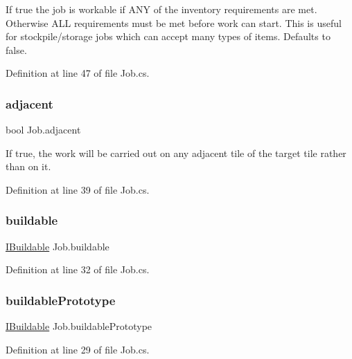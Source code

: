If true the job is workable if A\+NY of the inventory requirements are met. Otherwise A\+LL requirements must be met before work can start. This is useful for stockpile/storage jobs which can accept many types of items. Defaults to false. 



Definition at line 47 of file Job.\+cs.

\mbox{\label{class_job_a68dea057c25e34f4d55cb70e913991a8}} 
\subsubsection{\texorpdfstring{adjacent}{adjacent}}
{\footnotesize\ttfamily bool Job.\+adjacent}



If true, the work will be carried out on any adjacent tile of the target tile rather than on it. 



Definition at line 39 of file Job.\+cs.

\mbox{\label{class_job_a59502e5a19ee4d1ff89eb97c933b6f8e}} 
\subsubsection{\texorpdfstring{buildable}{buildable}}
{\footnotesize\ttfamily \hyperlink{interface_i_buildable}{I\+Buildable} Job.\+buildable}



Definition at line 32 of file Job.\+cs.

\mbox{\label{class_job_a53afb8d21780b4252d6aa12d97765d00}} 
\subsubsection{\texorpdfstring{buildable\+Prototype}{buildablePrototype}}
{\footnotesize\ttfamily \hyperlink{interface_i_buildable}{I\+Buildable} Job.\+buildable\+Prototype}



Definition at line 29 of file Job.\+cs.

